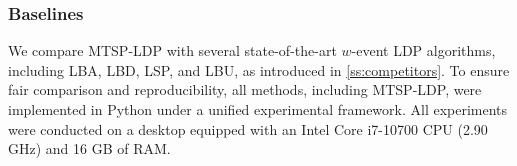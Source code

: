 
\subsubsection{Baselines}

We compare MTSP-LDP with several state-of-the-art $w$-event LDP algorithms,
including LBA, LBD, LSP, and LBU, as introduced in \cref{ss:competitors}.
To ensure fair comparison and reproducibility, all methods, including MTSP-LDP,
were implemented in Python under a unified experimental framework.
All experiments were conducted on a desktop equipped with an Intel Core i7-10700
CPU (2.90 GHz) and 16 GB of RAM.
